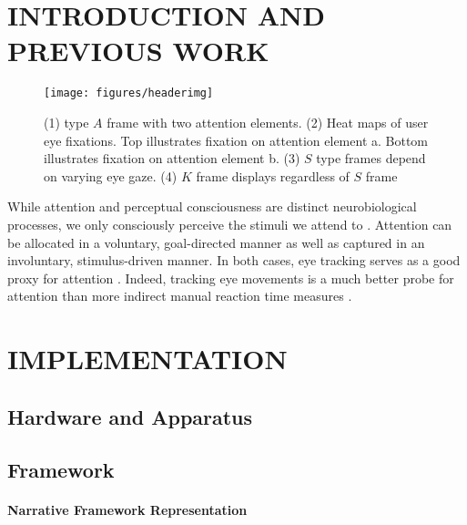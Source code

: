 \renewcommand{\thechapter}{}
\renewcommand{\chaptername}{}



\section*{INTRODUCTION AND PREVIOUS WORK} 

\begin{figure}[ht]
  \centering
   \texttt{[image: figures/headerimg]}
   \caption{(1) type $A$ frame with two attention elements. (2) Heat maps of user eye fixations. Top illustrates fixation on attention element a. Bottom illustrates fixation on attention element b. (3) $S$ type frames depend on varying eye gaze. (4) $K$ frame displays regardless of $S$ frame}
\end{figure}


While attention and perceptual consciousness are distinct neurobiological processes, we only consciously perceive the stimuli we attend to \citep{koch2007attention}. Attention can be allocated in a voluntary, goal-directed manner as well as captured in an involuntary, stimulus-driven manner. In both cases, eye tracking serves as a good proxy for attention \citep{hoffman1995role}. Indeed, tracking eye movements is a much better probe for attention than more indirect manual reaction time measures \citep{duc20085}.


\section*{IMPLEMENTATION} \label{chapterimplementation}

\subsection*{Hardware and Apparatus}

\subsection*{Framework}

\paragraph{Narrative Framework Representation}


